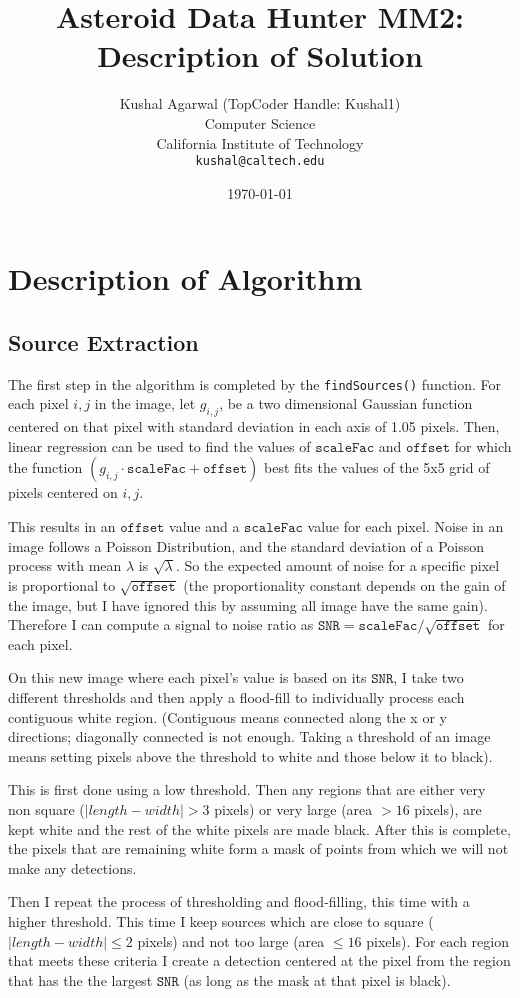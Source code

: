 \documentclass[letterpaper,options]{article}
\title{Asteroid Data Hunter MM2: Description of Solution}
\author{Kushal Agarwal (TopCoder Handle: Kushal1)\\ Computer Science\\California Institute of Technology\\ \texttt{kushal@caltech.edu}}
\date{\today}
\begin{document}
\maketitle


\section{Description of Algorithm}
\subsection{Source Extraction}
The first step in the algorithm is completed by the \texttt{findSources()} function. For each pixel $i,j$ in the image, let $g_{i,j}$,  be a two dimensional Gaussian function centered on that pixel with standard deviation in each axis of 1.05 pixels. Then, linear regression can be used to find the values of $\texttt{scaleFac}$ and $\texttt{offset}$ for which the function $(g_{i,j}\cdot\texttt{scaleFac}+\texttt{offset})$ best fits the values of the 5x5 grid of pixels centered on $i,j$.

This results in an $\texttt{offset}$ value and a $\texttt{scaleFac}$ value for each pixel. Noise in an image follows a Poisson Distribution, and the standard deviation of a Poisson process with mean $\lambda$ is $\sqrt{\lambda}$. So the expected amount of noise for a specific pixel is proportional to $\sqrt{\texttt{offset}}$ (the proportionality constant depends on the gain of the image, but I have ignored this by assuming all image have the same gain). Therefore I can compute a signal to noise ratio as $\texttt{SNR} =\texttt{scaleFac}/\sqrt{\texttt{offset}}$ for each pixel.

On this new image where each pixel's value is based on its $\texttt{SNR}$, I take two different thresholds and then apply a flood-fill to individually process each contiguous white region. (Contiguous means connected along the x or y directions; diagonally connected is not enough. Taking a threshold of an image means setting pixels above the threshold to white and those below it to black).

This is first done using a low threshold. Then any regions that are either very non square ($|length-width|>3$ pixels) or very large (area $ >16$ pixels), are kept white and the rest of the white pixels are made black. After this is complete, the pixels that are remaining white form a mask of points from which we will not make any detections.

Then I repeat the process of thresholding and flood-filling, this time with a higher threshold. This time I keep sources which are close to square ($|length-width|\le2$ pixels) and not too large (area $\le16$ pixels). For each region that meets these criteria I create a detection centered at the pixel from the region that has the the largest $\texttt{SNR}$ (as long as the mask at that pixel is black).
\end{document}

